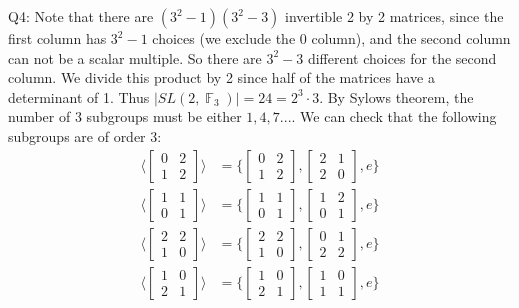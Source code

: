 \documentclass[letterpaper]{article}
\DeclareMathOperator{\F}{\mathbb{F}}
\begin{document}
 
\noindent Q4: Note that there are $(3^2-1)(3^2-3)$ invertible 2 by 2 matrices, since the first column has $3^2-1$ choices (we exclude the 0 column), and the second column can not be a scalar multiple. So there are $3^2-3$ different choices for the second column. We divide this product by 2 since half of the matrices have a determinant of 1. Thus $|SL(2,\F_3)| = 24 = 2^3\cdot 3. $ By Sylows theorem, the number of $3$ subgroups must be either $1,4,7...$. We can check that the following subgroups are of order 3: 
\begin{align*}
    \Big\langle {\begin{bmatrix}0 & 2 \\ 1 & 2 \end{bmatrix}} \Big\rangle & = \Big \{{\begin{bmatrix}0 & 2 \\ 1 & 2 \end{bmatrix}} , {\begin{bmatrix}  2&1  \\ 2 & 0 \end{bmatrix}}, e \Big \}
    \\ \Big\langle {\begin{bmatrix}1 & 1 \\ 0 & 1 \end{bmatrix}} \Big\rangle & = \Big \{{\begin{bmatrix}1 & 1 \\ 0 & 1 \end{bmatrix}} , {\begin{bmatrix}  1&2  \\ 0 & 1 \end{bmatrix}}, e \Big \}
    \\ \Big\langle {\begin{bmatrix}2 & 2 \\ 1 & 0 \end{bmatrix}} \Big\rangle & = \Big \{{\begin{bmatrix}2 & 2 \\ 1 & 0 \end{bmatrix}} , {\begin{bmatrix}  0&1  \\ 2 & 2 \end{bmatrix}}, e \Big \}
    \\ \Big\langle {\begin{bmatrix}1 & 0 \\ 2 & 1 \end{bmatrix}} \Big\rangle & = \Big \{{\begin{bmatrix}1 & 0 \\ 2 & 1 \end{bmatrix}} , {\begin{bmatrix}  1&0  \\ 1 & 1 \end{bmatrix}}, e \Big \}
\end{align*}
\end{document}
